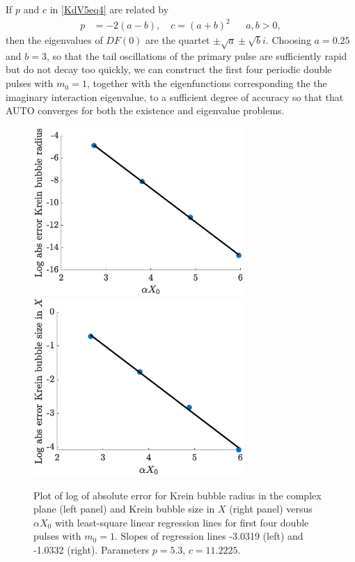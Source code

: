\documentclass[12pt]{elsarticle}
\theoremstyle{plain}
\theoremstyle{definition}
\theoremstyle{remark}
\numberwithin{theorem}{section}
\numberwithin{equation}{section}
\begin{document}
If $p$ and $c$ in \cref{KdV5eq4} are related by
\begin{align}\label{KdVpabc}
p &= -2(a-b), \quad c = (a+b)^2 && a, b > 0,
\end{align}
then the eigenvalues of $DF(0)$ are the quartet $\pm \sqrt{a} \pm \sqrt{b} i$. Choosing $a = 0.25$ and $b = 3$, so that the tail oscillations of the primary pulse are sufficiently rapid but do not decay too quickly, we can construct the first four periodic double pulses with $m_0 = 1$, together with the eigenfunctions corresponding the the imaginary interaction eigenvalue, to a sufficient degree of accuracy so that that AUTO converges for both the existence and eigenvalue problems. 
\begin{figure}
\begin{center}
\includegraphics[width=8cm]{images/KreinRadiusError.eps}
\includegraphics[width=8cm]{images/KreinRadiusXError.eps}
\end{center}
\caption{Plot of log of absolute error for Krein bubble radius in the complex plane (left panel) and Krein bubble size in $X$ (right panel) versus $\alpha X_0$ with least-square linear regression lines for first four double pulses with $m_0 = 1$. Slopes of regression lines -3.0319 (left) and -1.0332 (right). Parameters $p = 5.3$, $c = 11.2225$.
}
\label{fig:kreinerrors}
\end{figure}
\end{document}
